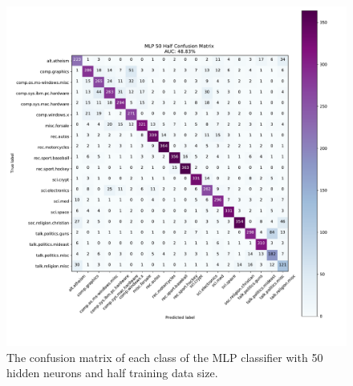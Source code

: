 \documentclass[twocolumn]{extarticle}
\begin{document}
\begin{appendices}
\begin{figure}
\centering
\includegraphics[width=0.9\linewidth]{"charts/MLP 50 Half"}
\caption{The confusion matrix of each class of the MLP classifier with 50 hidden neurons and half training data size.}
\label{fig:mlp-half-conf}
\end{figure}



\end{appendices}
\end{document}
